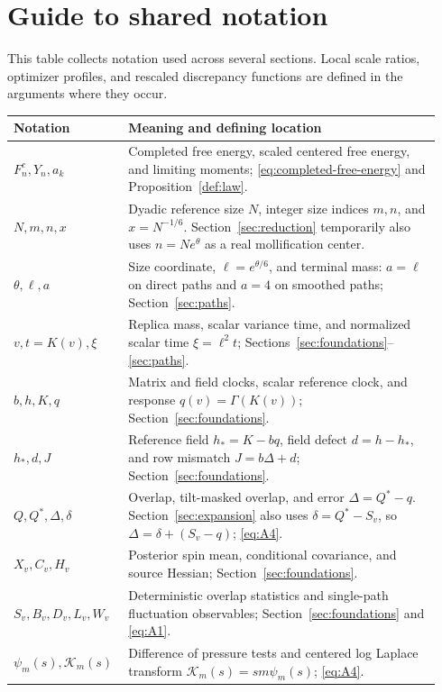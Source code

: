 \section{Guide to shared notation}
\label{sec:notation-guide}

This table collects notation used across several sections. Local scale
ratios, optimizer profiles, and rescaled discrepancy functions are defined
in the arguments where they occur.
\begingroup
\small
\renewcommand{\arraystretch}{1.12}
\begin{longtable}{@{}p{0.23\linewidth}p{0.71\linewidth}@{}}
\toprule
Notation & Meaning and defining location \\
\midrule
\endhead
\(F_n^c,Y_n,a_k\)
 & Completed free energy, scaled centered free energy, and limiting
 moments; \eqref{eq:completed-free-energy} and Proposition~\ref{def:law}. \\
\(N,m,n,x\)
 & Dyadic reference size \(N\), integer size indices \(m,n\), and
 \(x=N^{-1/6}\). Section~\ref{sec:reduction} temporarily also uses
 \(n=Ne^\theta\) as a real mollification center. \\
\(\theta,\ell,a\)
 & Size coordinate, \(\ell=e^{\theta/6}\), and terminal mass:
 \(a=\ell\) on direct paths and \(a=4\) on smoothed paths;
 Section~\ref{sec:paths}. \\
\(v,t=K(v),\xi\)
 & Replica mass, scalar variance time, and normalized scalar time
 \(\xi=\ell^2t\); Sections~\ref{sec:foundations}--\ref{sec:paths}. \\
\(b,h,K,q\)
 & Matrix and field clocks, scalar reference clock, and response
 \(q(v)=\Gamma(K(v))\); Section~\ref{sec:foundations}. \\
\(h_*,d,J\)
 & Reference field \(h_*=K-bq\), field defect \(d=h-h_*\),
 and row mismatch \(J=b\Delta+d\); Section~\ref{sec:foundations}. \\
\(Q,Q^*,\Delta,\delta\)
 & Overlap, tilt-masked overlap, and error \(\Delta=Q^*-q\).
 Section~\ref{sec:expansion} also uses \(\delta=Q^*-S_v\), so
 \(\Delta=\delta+(S_v-q)\);
 \eqref{eq:A4}. \\
\(X_v,C_v,H_v\)
 & Posterior spin mean, conditional covariance, and source Hessian;
 Section~\ref{sec:foundations}. \\
\(S_v,B_v,D_v,L_v,W_v\)
 & Deterministic overlap statistics and single-path fluctuation
 observables; Section~\ref{sec:foundations} and \eqref{eq:A1}. \\
\(\psi_m(s),\mathcal K_m(s)\)
 & Difference of pressure tests and centered log Laplace transform
 \(\mathcal K_m(s)=sm\psi_m(s)\); \eqref{eq:A4}. \\

\end{longtable}
